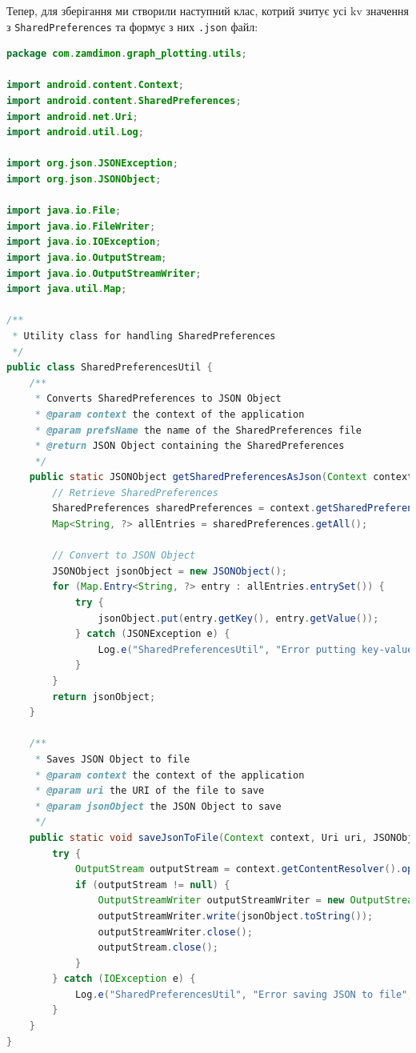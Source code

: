 \documentclass[oneside,solution]{android-assign}
\begin{document}
Тепер, для зберігання ми створили наступний клас, котрий зчитує усі kv значення з \texttt{SharedPreferences} та формує з них \texttt{.json} файл:
\begin{lstlisting}[language=java]
package com.zamdimon.graph_plotting.utils;

import android.content.Context;
import android.content.SharedPreferences;
import android.net.Uri;
import android.util.Log;

import org.json.JSONException;
import org.json.JSONObject;

import java.io.File;
import java.io.FileWriter;
import java.io.IOException;
import java.io.OutputStream;
import java.io.OutputStreamWriter;
import java.util.Map;

/**
 * Utility class for handling SharedPreferences
 */
public class SharedPreferencesUtil {
    /**
     * Converts SharedPreferences to JSON Object
     * @param context the context of the application
     * @param prefsName the name of the SharedPreferences file
     * @return JSON Object containing the SharedPreferences
     */
    public static JSONObject getSharedPreferencesAsJson(Context context, String prefsName) {
        // Retrieve SharedPreferences
        SharedPreferences sharedPreferences = context.getSharedPreferences(prefsName, Context.MODE_PRIVATE);
        Map<String, ?> allEntries = sharedPreferences.getAll();

        // Convert to JSON Object
        JSONObject jsonObject = new JSONObject();
        for (Map.Entry<String, ?> entry : allEntries.entrySet()) {
            try {
                jsonObject.put(entry.getKey(), entry.getValue());
            } catch (JSONException e) {
                Log.e("SharedPreferencesUtil", "Error putting key-value into json object", e);
            }
        }
        return jsonObject;
    }

    /**
     * Saves JSON Object to file
     * @param context the context of the application
     * @param uri the URI of the file to save
     * @param jsonObject the JSON Object to save
     */
    public static void saveJsonToFile(Context context, Uri uri, JSONObject jsonObject) {
        try {
            OutputStream outputStream = context.getContentResolver().openOutputStream(uri);
            if (outputStream != null) {
                OutputStreamWriter outputStreamWriter = new OutputStreamWriter(outputStream);
                outputStreamWriter.write(jsonObject.toString());
                outputStreamWriter.close();
                outputStream.close();
            }
        } catch (IOException e) {
            Log.e("SharedPreferencesUtil", "Error saving JSON to file", e);
        }
    }
}
\end{lstlisting}
\end{document}
